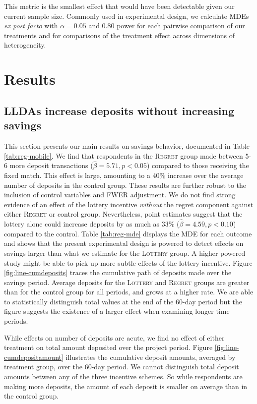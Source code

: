 \documentclass[11pt]{article}
\begin{document}
		This metric is the smallest effect that would have been detectable given our current sample size. Commonly used in experimental design, we calculate MDEs \textit{ex post facto} with $\alpha = 0.05$ and 0.80 power for each pairwise comparison of our treatments and for comparisons of the treatment effect across dimensions of heterogeneity.

\section{Results} \label{sec:results}

	\subsection{LLDAs increase deposits without increasing savings}

		This section presents our main results on savings behavior, documented in Table \ref{tab:reg-mobile}. We find that respondents in the \textsc{Regret} group made between 5-6 more deposit transactions ($\hat \beta = 5.71, p < 0.05$) compared to those receiving the fixed match. This effect is large, amounting to a 40\% increase over the average number of deposits in the control group. These results are further robust to the inclusion of control variables and FWER adjustment. We do not find strong evidence of an effect of the lottery incentive \textit{without} the regret component against either \textsc{Regret} or control group. Nevertheless, point estimates suggest that the lottery alone could increase deposits by as much as 33\% ($\hat \beta = 4.59, p < 0.10$) compared to the control. Table \ref{tab:reg-mde} displays the MDE for each outcome and shows that the present experimental design is powered to detect effects on savings larger than what we estimate for the \textsc{Lottery} group. A higher powered study might be able to pick up more subtle effects of the lottery incentive. Figure \ref{fig:line-cumdeposits} traces the cumulative path of deposits made over the savings period. Average deposits for the \textsc{Lottery} and \textsc{Regret} groups are greater than for the control group for all periods, and grows at a higher rate. We are able to statistically distinguish total values at the end of the 60-day period but the figure suggests the existence of a larger effect when examining longer time periods.

		While effects on number of deposits are acute, we find no effect of either treatment on total amount deposited over the project period. Figure \ref{fig:line-cumdepositamount} illustrates the cumulative deposit amounts, averaged by treatment group, over the 60-day period. We cannot distinguish total deposit amounts between any of the three incentive schemes. So while respondents are making more deposits, the amount of each deposit is smaller on average than in the control group.
\end{document}
